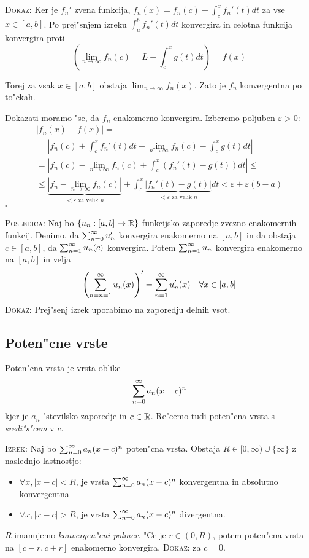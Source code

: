 \textsc{Dokaz:} Ker je $f_n'$ zvena funkcija, $f_n(x) = f_n(c) + \int_c^x f_n'(t) dt$ za vse $x \in [a, b]$. Po prej"snjem izreku $\int_a^b f_n'(t) dt$ konvergira in celotna funkcija konvergira proti
\begin{equation*}
\left( \lim_{n \to \infty} f_n (c) = L + \int_c^x g(t) dt \right) = f(x)
\end{equation*}

Torej za vsak $x \in [a, b]$ obstaja $\lim_{n \to \infty} f_n (x)$. Zato je $f_n$ konvergentna po to"ckah.

Dokazati moramo "se,  da $f_n$ enakomerno konvergira. Izberemo poljuben $\varepsilon > 0$:
\begin{multline*}
|f_n(x) - f(x)| = \\
= \left| f_n(c) + \int_c^x f_n'(t) dt - \lim_{n \to \infty} f_n(c) - \int_c^x g(t) dt \right| = \\
= \left| f_n(c) - \lim_{n \to \infty} f_n (c) + \int_c^x (f_n'(t) - g(t)) dt \right| \leq \\
\leq \underbrace{|f_n - \lim_{n \to \infty} f_n(c)|}_{< \varepsilon \text{ za velik $n$}} + \int_c^x \underbrace{|f_n'(t) - g(t)|}_{< \varepsilon \text{ za velik $n$}} dt < \varepsilon + \varepsilon(b-a)
\end{multline*}
\hfill $\square$

\textsc{Posledica:} Naj bo $\{ u_n: [a, b] \to \mathbb{R} \}$ funkcijsko zaporedje zvezno enakomernih funkcij. Denimo, da $\sum_{n = 0}^{\infty} u_n'$ konvergira enakomerno na $[a, b]$ in da obstaja $c \in [a, b]$, da $\sum_{n = 1}^{\infty} u_n(c)$ konvergira. Potem $\sum_{n = 1}^{\infty} u_n$ konvergira enakomerno na $[a, b]$ in velja
\begin{equation*}
\left( \sum_{n = n=1}^{\infty} u_n (x) \right)' = \sum_{n = 1}^{\infty} u_n'(x) \quad \forall x \in [a, b]
\end{equation*}
\textsc{Dokaz:} Prej"senj izrek uporabimo na zaporedju delnih vsot.

\subsection{Poten"cne vrste}
 Poten"cna vrsta je vrsta oblike
\begin{equation*}
\sum_{n = 0}^{\infty} a_n (x-c)^n
\end{equation*}
kjer je $a_n$ "stevilsko zaporedje in $c \in \mathbb{R}$. Re"cemo tudi poten"cna vrsta s \emph{sredi"s"cem} v $c$.

\textsc{Izrek:} Naj bo $\sum_{n = 0}^{\infty} a_n (x - c)^n$ poten"cna vrsta. Obstaja $R \in [0, \infty) \cup \{ \infty \}$ z naslednjo lastnostjo:
\begin{itemize}
    \item $\forall x, |x - c| < R$,  je vrsta $\sum_{n = 0}^{\infty} a_n (x - c)^n$ konvergentna in absolutno konvergentna
    \item $\forall x, |x - c| > R$, je vrsta $\sum_{n = 0}^{\infty} a_n (x - c)^n$ divergentna.
\end{itemize}
$R$ imanujemo \emph{konvergen"cni polmer}. "Ce je $r \in (0, R)$, potem poten"cna vrsta na $[c - r, c + r]$ enakomerno konvergira.
\textsc{Dokaz:} za $c = 0$.

